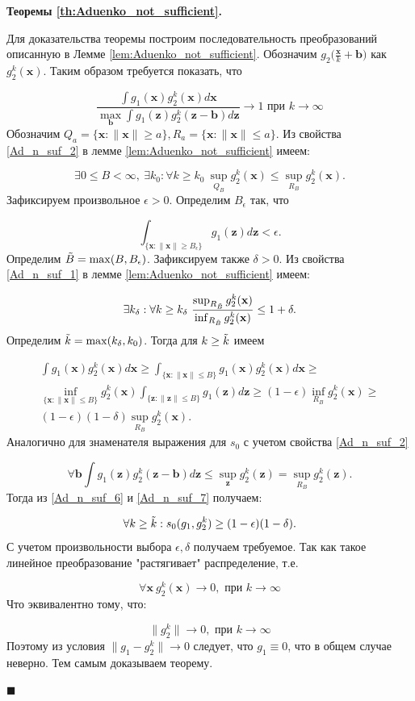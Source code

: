 \documentclass[12pt]{extarticle}
\newenvironment{Proof} %
    {\par\noindent{\bf Доказательство.}} %
    {\hfill$\scriptstyle\blacksquare$} %
\newcommand{\bfx}{\mathbf{x}}
\newcommand{\bfz}{\mathbf{z}}
\newcommand{\bfb}{\mathbf{b}}
\begin{document}
\begin{Proof}\textbf{ Теоремы \ref{th:Aduenko_not_sufficient}.}

Для доказательства теоремы построим последовательность преобразований описанную в Лемме \ref{lem:Aduenko_not_sufficient}. Обозначим $g_2\Big(\frac{\bfx}{k} + \bfb\Big)$ как $g^k_2(\bfx)$. Таким образом требуется показать, что 

$$\frac{ \int g_1(\bfx)g^k_2(\bfx)d\bfx}{\max_\bfb \int g_1(\bfz)g^k_2(\bfz - \bfb)d\bfz} \to 1 \text{ при } k \to \infty$$
Обозначим $Q_a = \{\bfx : \|\bfx\| \geq a\}, R_a = \{\bfx : \|\bfx\| \leq a\}$. Из свойства \eqref{Ad_n_suf_2} в лемме \ref{lem:Aduenko_not_sufficient} имеем:

$$\exists 0 \leq B < \infty, \ \exists k_0 : \forall k \geq k_0 \ \sup_{Q_B} g^k_2(\bfx) \leq \sup_{R_B} g^k_2(\bfx).$$
Зафиксируем произвольное $\epsilon > 0$. Определим $B_\epsilon$ так, что 

$$ \int_{\{\bfx : \|\bfx \| \geq B_\epsilon\}} g_1(\bfz)d\bfz < \epsilon.$$
Определим $\Tilde{B} = \max(B, B_\epsilon)$. Зафиксируем также $\delta > 0$. Из свойства \eqref{Ad_n_suf_1} в лемме \ref{lem:Aduenko_not_sufficient} имеем:

$$\exists k_\delta : \forall k \geq k_\delta \  \frac{\sup_{R_{\Tilde{B}}}g^k_2(\bfx)}{\inf_{R_{\Tilde{B}}}g^k_2(\bfx)} \leq 1 + \delta.$$
Определим $\Tilde{k} = \max(k_\delta, k_0)$. Тогда для $k \geq \Tilde{k}$ имеем

\begin{multline}
    \label{Ad_n_suf_6}
    \int g_1(\bfx)g^k_2(\bfx)d\bfx \geq \int_{\{\bfx: \|\bfx\|\leq B\}} g_1(\bfx)g^k_2(\bfx)d\bfx \geq \\ \inf_{\{\bfx: \|\bfx\|\leq B\}} g^k_2(\bfx) \int_{\{\bfz: \|\bfz\|\leq B\}} g_1(\bfz)d\bfz \geq (1 - \epsilon) \inf_{R_B} g^k_2(\bfx) \geq \\ (1 - \epsilon)(1 - \delta) \sup_{R_B} g^k_2 (\bfx). 
\end{multline}
Аналогично для знаменателя выражения для $s_0$ с учетом свойства \eqref{Ad_n_suf_2} 

\begin{equation}
    \label{Ad_n_suf_7}
    \forall \bfb \int g_1(\bfz)g^k_2(\bfz - \bfb)d\bfz \leq \sup_{\bfz}g^k_2(\bfz) = \sup_{R_B}g^k_2(\bfz).
\end{equation}
Тогда из \eqref{Ad_n_suf_6} и \eqref{Ad_n_suf_7} получаем:

$$ \forall k \geq \Tilde{k} : s_0(g_1, g^k_2) \geq (1 - \epsilon)(1 - \delta). $$
С учетом произвольности выбора $\epsilon, \delta$ получаем требуемое. Так как такое линейное преобразование "растягивает"  распределение, т.е. 

$$ \forall \bfx \ g^k_2(\bfx) \to 0, \text{ при } k \to \infty$$
Что эквивалентно тому, что:

$$ \|g^k_2\| \to 0, \text{ при } k \to \infty$$
Поэтому из условия $\|g_1 - g^k_2\| \to 0$ следует, что $g_1 \equiv 0$, что в общем случае неверно. Тем самым доказываем теорему.


\end{Proof}
\end{document}
